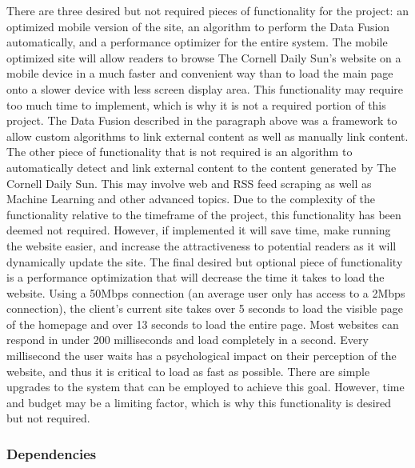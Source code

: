 \documentclass[12pt]{article} %
\begin{document}
There are three desired but not required pieces of functionality for the project: an optimized mobile version of the site, an algorithm to perform the Data Fusion automatically, and a performance optimizer for the entire system. The mobile optimized site will allow readers to browse The Cornell Daily Sun’s website on a mobile device in a much faster and convenient way than to load the main page onto a slower device with less screen display area. This functionality may require too much time to implement, which is why it is not a required portion of this project. The Data Fusion described in the paragraph above was a framework to allow custom algorithms to link external content as well as manually link content. The other piece of functionality that is not required is an algorithm to automatically detect and link external content to the content generated by The Cornell Daily Sun. This may involve web and RSS feed scraping as well as Machine Learning and other advanced topics. Due to the complexity of the functionality relative to the timeframe of the project, this functionality has been deemed not required. However, if implemented it will save time, make running the website easier, and increase the attractiveness to potential readers as it will dynamically update the site. The final desired but optional piece of functionality is a performance optimization that will decrease the time it takes to load the website. Using a 50Mbps connection (an average user only has access to a 2Mbps connection), the client’s current site takes over 5 seconds to load the visible page of the homepage and over 13 seconds to load the entire page. Most websites can respond in under 200 milliseconds and load completely in a second. Every millisecond the user waits has a psychological impact on their perception of the website, and thus it is critical to load as fast as possible. There are simple upgrades to the system that can be employed to achieve this goal. However, time and budget may be a limiting factor, which is why this functionality is desired but not required.

\subsubsection{Dependencies}
                   
\end{document}
